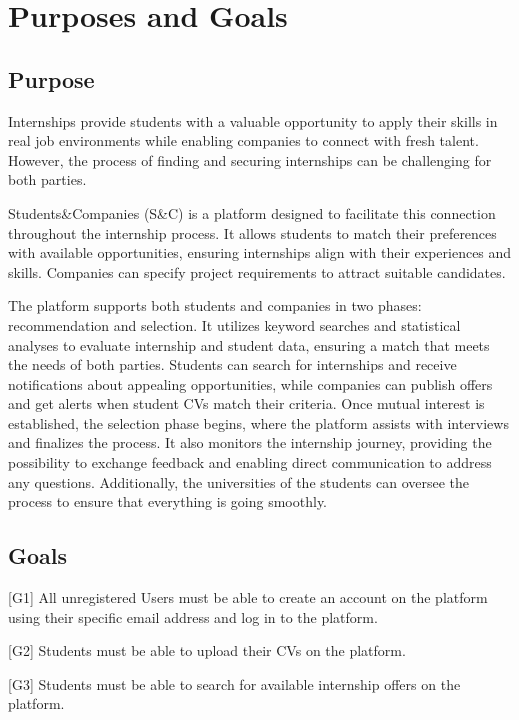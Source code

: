 \renewcommand{\thesection}{\Alph{section}}
\section{Purposes and Goals}\label{sec:purposeandgoals}
\subsection{Purpose}\label{subsec:purpose}
Internships provide students with a valuable opportunity to apply their skills in real job environments while enabling companies to connect with 
fresh talent. However, the process of finding and securing internships can be challenging for both parties.

Students\&Companies (S\&C) is a platform designed to facilitate this connection throughout the internship process. It allows 
students to match their preferences with available opportunities, ensuring internships align with their experiences and skills. 
Companies can specify project requirements to attract suitable candidates.

The platform supports both students and companies in two phases: recommendation and selection. It utilizes keyword searches 
and statistical analyses to evaluate internship and student data, ensuring a match that meets the needs of both parties. 
Students can search for internships and receive notifications about appealing opportunities, while companies can publish offers and get 
alerts when student CVs match their criteria. Once mutual interest is established, the selection phase begins, where the platform assists 
with interviews and finalizes the process. It also monitors the internship journey, providing the possibility to exchange feedback and 
enabling direct communication to address any questions. Additionally, the universities of the students can oversee the process to ensure 
that everything is going smoothly.

\subsection{Goals}\label{subsec:goals}
[G1] All unregistered Users must be able to create an account on the platform using their specific email address and log in to the platform.

[G2] Students must be able to upload their CVs on the platform.

[G3] Students must be able to search for available internship offers on the platform.

